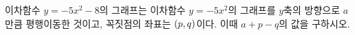 이차함수 $y=-5x^2-8$의 그래프는 이차함수 $y=-5x^2$의 그래프를 $y$축의 방향으로 $a$만큼 평행이동한 것이고, 꼭짓점의 좌표는 $(p{,}\mkern3mu\mathopen{}q)$이다. 이때 $a+p-q$의 값을 구하시오.
